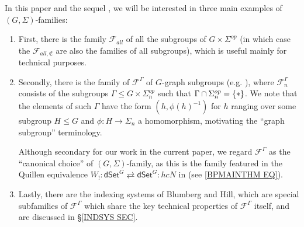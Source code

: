 \documentclass[a4paper,10pt
,draft
]{article}%
\numberwithin{equation}{section}
\numberwithin{figure}{section}
\theoremstyle{definition} %
\newcommand{\F}{\ensuremath{\mathcal F}}
\newcommand{\1}{\ensuremath{\mathbbm 1}}%
\begin{document}
In this paper and the sequel \cite{BP_TAS}, 
we will be interested in three main examples of $(G,\Sigma)$-families:

\begin{enumerate}[label = (\alph*)]
\item First, there is the family $\F_{all}$ of all the subgroups of $G \times \Sigma^{op}$
      (in which case the $\F_{all,\mathfrak{C}}$ are also the families of all subgroups), which is useful mainly for technical purposes.
      
\item Secondly, there is the family of $\F^{\Gamma}$
      of $G$-graph subgroups (e.g. \cite[Def. 6.36]{BP_geo}),
      where $\F^{\Gamma}_n$ consists of the subgroups
      $\Gamma \leq G \times \Sigma_n^{op}$
      such that $\Gamma \cap \Sigma_n^{op} = \{\**\}$.
      We note that the elements of such $\Gamma$
      have the form $(h,\phi(h)^{-1})$
      for $h$ ranging over some subgroup $H \leq G$
      and $\phi \colon H \to \Sigma_n$
      a homomorphism,
      motivating the ``graph subgroup'' terminology.
      
      Although secondary for our work in the current paper, we regard $\F^{\Gamma}$ as the ``canonical choice'' of
      $(G,\Sigma)$-family, 
      as this is the family featured in the Quillen equivalence
      $W_! \colon 
      \mathsf{dSet}^G \rightleftarrows 
      \mathsf{dSet}^G \colon hcN$
      in \cite[Thm. I]{BP_TAS} 
      (see \eqref{BPMAINTHM EQ}).
      
\item Lastly, there are the indexing systems of Blumberg and Hill,
      which are special subfamilies of $\F^{\Gamma}$
      which share the key technical properties of 
      $\F^{\Gamma}$ itself,
      and are discussed in \S \ref{INDSYS SEC}.
\end{enumerate}
\end{document}
